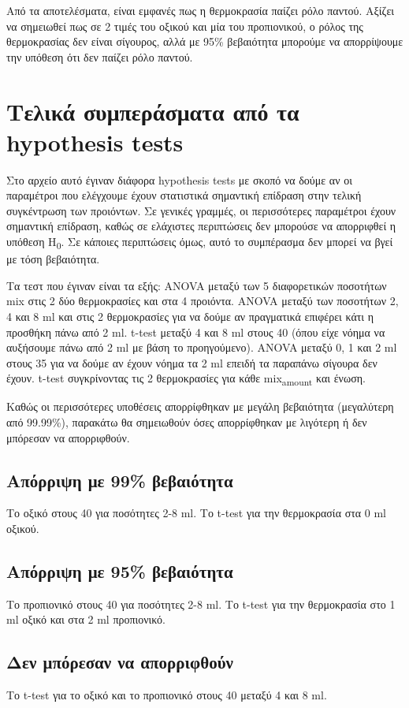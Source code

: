 \documentclass[11pt]{article}
\begin{document}
Από τα αποτελέσματα, είναι εμφανές πως η θερμοκρασία παίζει ρόλο παντού. Αξίζει να σημειωθεί πως σε 2 τιμές του οξικού και μία του προπιονικού, ο ρόλος της θερμοκρασίας δεν είναι σίγουρος, αλλά με 95\% βεβαιότητα μπορούμε να απορρίψουμε την υπόθεση ότι δεν παίζει ρόλο παντού.

\section{Τελικά συμπεράσματα από τα hypothesis tests}
\label{sec:org984ced7}
Στο αρχείο αυτό έγιναν διάφορα hypothesis tests με σκοπό να δούμε αν οι παραμέτροι που ελέγχουμε έχουν στατιστικά σημαντική επίδραση στην τελική συγκέντρωση των προιόντων. Σε γενικές γραμμές, οι περισσότερες παραμέτροι έχουν σημαντική επίδραση, καθώς σε ελάχιστες περιπτώσεις δεν μπορούσε να απορριφθεί η υπόθεση H\textsubscript{0}. Σε κάποιες περιπτώσεις όμως, αυτό το συμπέρασμα δεν μπορεί να βγεί με τόση βεβαιότητα.

Τα τεστ που έγιναν είναι τα εξής: ANOVA μεταξύ των 5 διαφορετικών ποσοτήτων mix στις 2 δύο θερμοκρασίες και στα 4 προιόντα. ANOVA μεταξύ των ποσοτήτων 2, 4 και 8 ml και στις 2 θερμοκρασίες για να δούμε αν πραγματικά επιφέρει κάτι η προσθήκη πάνω από 2 ml. t-test μεταξύ 4 και 8 ml στους 40 (όπου είχε νόημα να αυξήσουμε πάνω από 2 ml με βάση το προηγούμενο). ANOVA μεταξύ 0, 1 και 2 ml στους 35 για να δούμε αν έχουν νόημα τα 2 ml επειδή τα παραπάνω σίγουρα δεν έχουν. t-test συγκρίνοντας τις 2 θερμοκρασίες για κάθε mix\textsubscript{amount} και ένωση.

Καθώς οι περισσότερες υποθέσεις απορρίφθηκαν με μεγάλη βεβαιότητα (μεγαλύτερη από 99.99\%), παρακάτω θα σημειωθούν όσες απορρίφθηκαν με λιγότερη ή δεν μπόρεσαν να απορριφθούν.

\subsection{Απόρριψη με 99\% βεβαιότητα}
\label{sec:orga5cbaef}
Το οξικό στους 40 για ποσότητες 2-8 ml.
Το t-test για την θερμοκρασία στα 0 ml οξικού.

\subsection{Απόρριψη με 95\% βεβαιότητα}
\label{sec:orgbe18a9e}
Το προπιονικό στους 40 για ποσότητες 2-8 ml.
Το t-test για την θερμοκρασία στο 1 ml οξικό και στα 2 ml προπιονικό.

\subsection{Δεν μπόρεσαν να απορριφθούν}
\label{sec:orgeab9281}
Το t-test για το οξικό και το προπιονικό στους 40 μεταξύ 4 και 8 ml.
\end{document}
